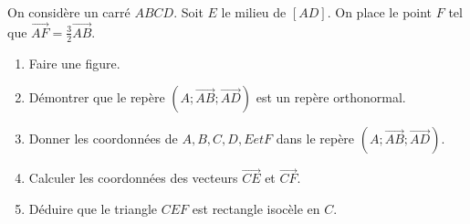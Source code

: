 
On considère un carré $ABCD$. Soit $E$ le milieu de $[AD]$. On place le point $F$ tel que $\overrightarrow{AF}=\frac{3}{2}\overrightarrow{AB}$.
\begin{enumerate}
\item Faire une figure.
\item Démontrer que le repère $\left(A ;\overrightarrow{AB};\overrightarrow{AD} \right)$ est un repère orthonormal.
\item Donner les coordonnées de $A, B, C, D, E et F$ dans le repère $\left(A ;\overrightarrow{AB};\overrightarrow{AD} \right)$.
\item Calculer les coordonnées des vecteurs $\overrightarrow{CE}$ et $\overrightarrow{CF}$.
\item Déduire que le triangle $CEF$ est rectangle isocèle en $C$.
\end{enumerate}
